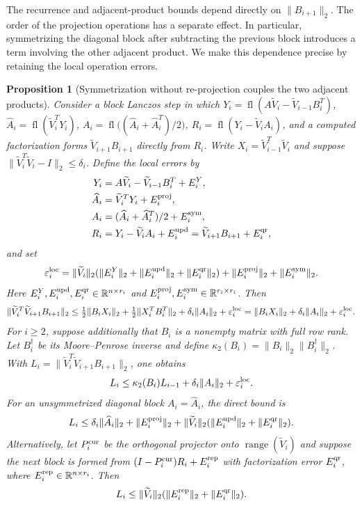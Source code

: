 \documentclass[11pt]{article}
\newtheorem{proposition}{Proposition}
\theoremstyle{definition}
\newcommand{\fl}{\operatorname{fl}}
\newcommand{\R}{\mathbb{R}}
\begin{document}
The recurrence and adjacent-product bounds depend directly on
$\|B_{i+1}\|_2$.  The order of the projection operations has a separate
effect.  In particular, symmetrizing the diagonal block after subtracting
the previous block introduces a term involving the other adjacent product.
We make this dependence precise by retaining the local operation errors.

\begin{proposition}[Symmetrization without re-projection couples the two adjacent products]
\label{prop:symmetrisation}
Consider a block Lanczos step in which
$Y_i=\fl(A\widetilde V_i-\widetilde V_{i-1}B_i^T)$,
$\widehat A_i=\fl(\widetilde V_i^TY_i)$, $A_i=\fl\bigl((\widehat A_i+\widehat A_i^T)/2\bigr)$,
$R_i=\fl(Y_i-\widetilde V_iA_i)$, and a computed factorization forms
$\widetilde V_{i+1}B_{i+1}$ directly from $R_i$.
Write $X_i=\widetilde V_{i-1}^T\widetilde V_i$ and suppose
$\|\widetilde V_i^T\widetilde V_i-I\|_2\le\delta_i$.
Define the local errors by
\begin{align*}
Y_i&=A\widetilde V_i-\widetilde V_{i-1}B_i^T+E_i^Y,\\
\widehat A_i&=\widetilde V_i^TY_i+E_i^{\rm proj},\\
A_i&=(\widehat A_i+\widehat A_i^T)/2+E_i^{\rm sym},\\
R_i&=Y_i-\widetilde V_iA_i+E_i^{\rm upd}
    =\widetilde V_{i+1}B_{i+1}+E_i^{\rm qr},
\end{align*}
and set
\[
\varepsilon_i^{\rm loc}
=\|\widetilde V_i\|_2
 (\|E_i^Y\|_2+\|E_i^{\rm upd}\|_2+\|E_i^{\rm qr}\|_2)
 +\|E_i^{\rm proj}\|_2+\|E_i^{\rm sym}\|_2.
\]
Here $E_i^Y,E_i^{\rm upd},E_i^{\rm qr}\in\R^{n\times r_i}$ and
$E_i^{\rm proj},E_i^{\rm sym}\in\R^{r_i\times r_i}$.
Then
\begin{equation}
 \|\widetilde V_i^T\widetilde V_{i+1}B_{i+1}\|_2
 \le\tfrac12\|B_iX_i\|_2+\tfrac12\|X_i^TB_i^T\|_2
       +\delta_i\|A_i\|_2+\varepsilon_i^{\rm loc}
 =\|B_iX_i\|_2+\delta_i\|A_i\|_2+\varepsilon_i^{\rm loc}.
 \label{eq:symmetrisation-recursion}
\end{equation}
For $i\ge2$, suppose additionally that $B_i$ is a nonempty matrix with full row rank.
Let $B_i^\dagger$ be its Moore--Penrose inverse and define
$\kappa_2(B_i)=\|B_i\|_2\|B_i^\dagger\|_2$.  With
$L_i=\|\widetilde V_i^T\widetilde V_{i+1}B_{i+1}\|_2$, one obtains
\[
 L_i\le\kappa_2(B_i)L_{i-1}
           +\delta_i\|A_i\|_2+\varepsilon_i^{\rm loc}.
\]
For an unsymmetrized diagonal block $A_i=\widehat A_i$, the direct bound is
\[
 L_i\le\delta_i\|\widehat A_i\|_2+\|E_i^{\rm proj}\|_2
       +\|\widetilde V_i\|_2
          (\|E_i^{\rm upd}\|_2+\|E_i^{\rm qr}\|_2).
\]
Alternatively, let $P_i^{\rm cur}$ be the orthogonal projector onto
$\operatorname{range}(\widetilde V_i)$ and suppose the next block is formed
from $(I-P_i^{\rm cur})R_i+E_i^{\rm rep}$ with factorization error
$E_i^{\rm qr}$, where $E_i^{\rm rep}\in\R^{n\times r_i}$.  Then
\[
 L_i\le\|\widetilde V_i\|_2
          (\|E_i^{\rm rep}\|_2+\|E_i^{\rm qr}\|_2).
\]
\end{proposition}
\end{document}
